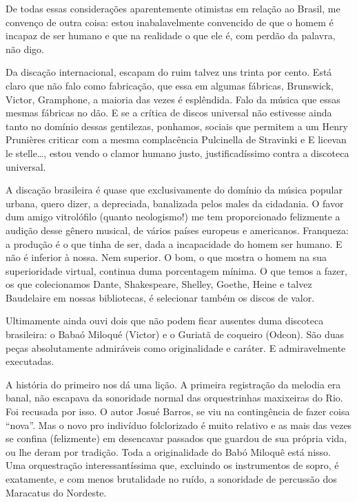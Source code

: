 De todas essas considerações aparentemente otimistas em relação ao
Brasil, me convenço de outra coisa: estou inabalavelmente convencido de
que o homem é incapaz de ser humano e que na realidade o que ele é, com
perdão da palavra, não digo.

Da discação internacional, escapam do ruim talvez uns trinta por cento.
Está claro que não falo como fabricação, que essa em algumas fábricas,
Brunswick, Victor, Gramphone, a maioria das vezes é esplêndida. Falo da
música que essas mesmas fábricas no dão. E se a crítica de discos
universal não estivesse ainda tanto no domínio dessas gentilezas,
ponhamos, sociais que permitem a um Henry Prunières criticar com a mesma
complacência Pulcinella de Stravinki e E licevan le stelle\ldots{}, estou
vendo o clamor humano justo, justificadíssimo contra a discoteca
universal.

A discação brasileira é quase que exclusivamente do domínio da música
popular urbana, quero dizer, a depreciada, banalizada pelos males da
cidadania. O favor dum amigo vitrolófilo (quanto neologismo!) me tem
proporcionado felizmente a audição desse gênero musical, de vários
países europeus e americanos. Franqueza: a produção é o que tinha de
ser, dada a incapacidade do homem ser humano. E não é inferior à nossa.
Nem superior. O bom, o que mostra o homem na sua superioridade virtual,
continua duma porcentagem mínima. O que temos a fazer, os que
colecionamos Dante, Shakespeare, Shelley, Goethe, Heine e talvez
Baudelaire em nossas bibliotecas, é selecionar também os discos de
valor.

Ultimamente ainda ouvi dois que não podem ficar ausentes duma discoteca
brasileira: o Babaó Miloqué (Victor) e o Guriatã de coqueiro (Odeon).
São duas peças absolutamente admiráveis como originalidade e caráter. E
admiravelmente executadas.

A história do primeiro nos dá uma lição. A primeira registração da
melodia era banal, não escapava da sonoridade normal das orquestrinhas
maxixeiras do Rio. Foi recusada por isso. O autor Josué Barros, se viu
na contingência de fazer coisa ``nova''. Mas o novo pro indivíduo
folclorizado é muito relativo e as mais das vezes se confina
(felizmente) em desencavar passados que guardou de sua própria vida, ou
lhe deram por tradição. Toda a originalidade do Babó Miloquê está nisso.
Uma orquestração interessantíssima que, excluindo os instrumentos de
sopro, é exatamente, e com menos brutalidade no ruído, a sonoridade de
percussão dos Maracatus do Nordeste.

